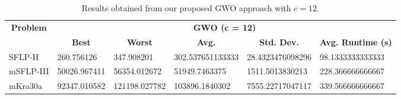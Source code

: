 \begin{table}[h!]
\begin{adjustwidth}{-1.18in}{}
	\centering
	\begin{tabular}{|l|l|l|l|l|l|}
	\hline
	\multicolumn{1}{|c|}{\multirow{2}{*}{\textbf{Problem}}} & \multicolumn{5}{c|}{\textbf{GWO (c = 12)}} \\ \cline{2-6} 
	\multicolumn{1}{|c|}{}                                  & \multicolumn{1}{c|}{\textbf{Best}} & \multicolumn{1}{c|}{\textbf{Worst}} & \multicolumn{1}{c|}{\textbf{Avg.}} & \multicolumn{1}{c|}{\textbf{Std. Dev.}} & \multicolumn{1}{c|}{\textbf{Avg. Runtime (s)}} \\ \hline
	SFLP-II                                                 & 260.756126                                  & 347.908201                                   & 302.537651133333                      & 28.4323476098296                                 & 98.1333333333333                                  \\ \hline
	mSFLP-III                                               & 50026.967411                                & 56354.012672                                 & 51949.7463375						         & 1511.5013830213                              & 228.366666666667                               \\ \hline
	mKra30a                                               & 92347.010582                                & 121198.027782                                 &
	103896.1840302							&
	7555.22717047117							&
	339.566666666667						\\ \hline
	\end{tabular}
\end{adjustwidth}
\caption{Results obtained from our proposed GWO approach with $c = 12$.}
\label{approach-gwo-c12-results}
\end{table}

